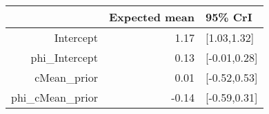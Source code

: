 \begin{tabular}{rrl}
  \hline
 & Expected mean & 95\% CrI \\ 
  \hline
Intercept & 1.17 & [1.03,1.32] \\ 
  phi\_Intercept & 0.13 & [-0.01,0.28] \\ 
  cMean\_prior & 0.01 & [-0.52,0.53] \\ 
  phi\_cMean\_prior & -0.14 & [-0.59,0.31] \\ 
   \hline
\end{tabular}

